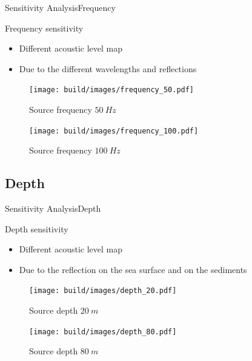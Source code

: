 \documentclass[9pt, xcolor={usenames, dvipsnames}]{beamer}
\begin{document}
				\begin{frame}{Sensitivity Analysis}{Frequency}
					\centering
					\begin{minipage}{0.8\textwidth}
						\begin{block}{Frequency sensitivity}
							\begin{itemize}
								\item Different acoustic level map
								\item Due to the different wavelengths and reflections
							\end{itemize}
						\end{block}
					\end{minipage}
					\begin{minipage}[t]{0.47\textwidth}
						\begin{figure}
							\texttt{[image: build/images/frequency\_50.pdf]}
							\caption{Source frequency $50\ Hz$}
						\end{figure}
					\end{minipage}
					\hfill
					\begin{minipage}[t]{0.47\textwidth}
						\begin{figure}
							\texttt{[image: build/images/frequency\_100.pdf]}
							\caption{Source frequency $100\ Hz$}
						\end{figure}
					\end{minipage}
				\end{frame}

			\subsection{Depth}

				\begin{frame}{Sensitivity Analysis}{Depth}
					\centering
					\begin{minipage}{0.8\textwidth}
						\begin{block}{Depth sensitivity}
							\begin{itemize}
								\item Different acoustic level map
								\item Due to the reflection on the sea surface and on the sediments
							\end{itemize}
						\end{block}
					\end{minipage}
					\hfill
					\begin{minipage}[t]{0.47\textwidth}
						\begin{figure}
							\texttt{[image: build/images/depth\_20.pdf]}
							\caption{Source depth $20\ m$}
						\end{figure}
					\end{minipage}
					\hfill
					\begin{minipage}[t]{0.47\textwidth}
						\begin{figure}
							\texttt{[image: build/images/depth\_80.pdf]}
							\caption{Source depth $80\ m$}
						\end{figure}
					\end{minipage}
				\end{frame}
\end{document}
